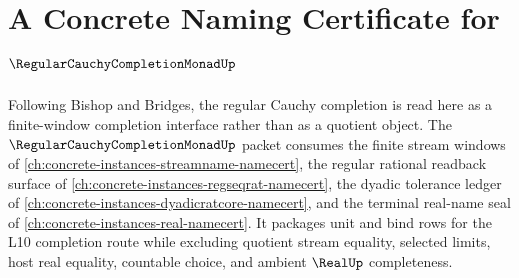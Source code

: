 \chapter{A Concrete Naming Certificate for $\RegularCauchyCompletionMonadUp$}
\label{ch:concrete-instances-regular-cauchy-completion-monad-namecert}

Following Bishop and Bridges, the regular Cauchy completion is read here as a finite-window completion interface rather than as a quotient object. The $\RegularCauchyCompletionMonadUp$ packet consumes the finite stream windows of \autoref{ch:concrete-instances-streamname-namecert}, the regular rational readback surface of \autoref{ch:concrete-instances-regseqrat-namecert}, the dyadic tolerance ledger of \autoref{ch:concrete-instances-dyadicratcore-namecert}, and the terminal real-name seal of \autoref{ch:concrete-instances-real-namecert}. It packages unit and bind rows for the L10 completion route while excluding quotient stream equality, selected limits, host real equality, countable choice, and ambient $\RealUp$ completeness.


